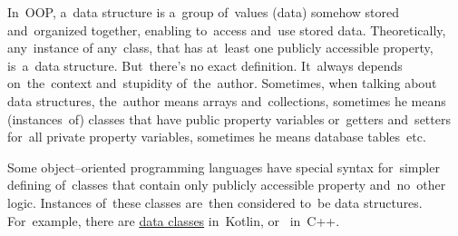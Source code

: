 \label{datastructure}
In~OOP, a~data structure is a~group of~values (data) somehow stored and~organized together, enabling to~access and~use stored data.
Theoretically, any~instance of any~class, that has at~least one publicly accessible property, is~a~data structure.
But~there's no exact definition.
It~always depends on~the~context and~stupidity of~the~author.
Sometimes, when talking about data structures, the~author means arrays and~collections, sometimes he means (instances~of) classes that have public property variables or~getters and~setters for~all private property variables, sometimes he means database tables~etc.

Some object--oriented programming languages have special syntax for~simpler defining of~classes that contain only publicly accessible property and~no~other logic.
Instances of~these classes are~then considered to~be data structures.
For~example, there are \hyperref[kotlindataclass]{data classes} in~Kotlin, or~ in~C++.
